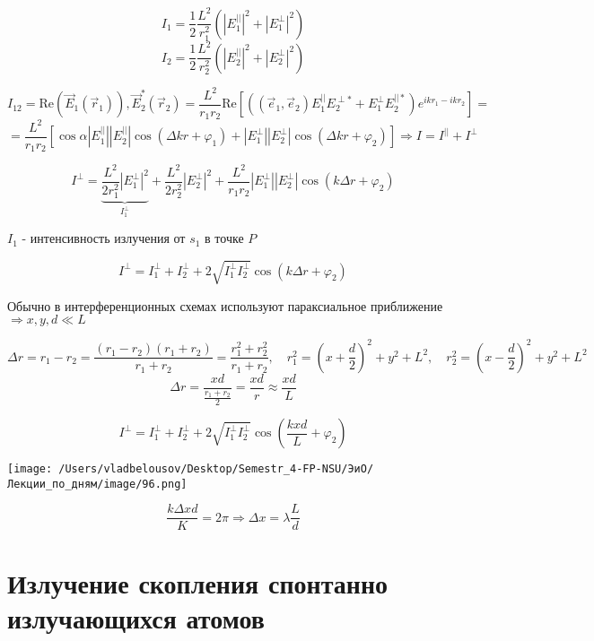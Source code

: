 \documentclass[12pt, a4paper]{report}
\begin{document}
\[ I_1  = \frac{1}{2 }  \frac{ L ^2 }{r_1 ^2 } ( |E_1 ^{|| } | ^2 + |E_1 ^{\perp } | ^2 )  \] 
\[ I_2 = \frac{1}{2 }  \frac{ L ^2 }{r_2  ^2 } ( |E_2 ^{ ||} | ^2 + |E_2 ^{\perp }  | ^2 )   \] 

\[ I_{12} = \mathrm{Re }  (\vec{E } _1 (\vec{r}_1 )), \vec{E } _2 ^{ * } (\vec{r}_2 )  = \frac{L ^2 }{r_1 r_2 } \mathrm{ Re } [((\vec{e } _1 , \vec{ e } _2 )E_1 ^{||}  E_2 ^{\perp* } + E_1 ^{\perp } E_2 ^{|| *}) e^{i k r_1 - i k r_2 }   ]  =\]  
\[ = \frac{L ^2 }{r_1 r_2 } [ \cos  \alpha |E_1 ^{||} | |E_2 ^{||} |\cos (\Delta k r + \varphi_1 )+ |E_1 ^{\perp } ||E_2^{\perp } |\cos (\Delta k r + \varphi_2 )]\Rightarrow I = I^{||}  + I^{\perp }   \] 

\[ I^{\perp } = \underbrace{\frac{L ^2}{2r_1 ^2 } |E_1 ^{\perp } | ^2}_{I_1^{\perp } } + \frac{L ^2 }{2 r_2 ^2 }|E_2 ^{\perp } | ^2   + \frac{L ^2 }{r_1 r_2 } |E_1 ^{\perp }  |  |E_2^{\perp } | \cos  (k \Delta r + \varphi_2 ) \] 

\( I_1  \) - интенсивность излучения от \( s_1  \) в точке \( P \) 

\[ I^{\perp } = I_1 ^{\perp } + I_2 ^{\perp } +2 \sqrt{I_1 ^{\perp }I_2 ^{\perp }  } \cos (k \Delta r + \varphi_2 )   \] 

Обычно в интерференционных схемах используют параксиальное приближение \( \Rightarrow x,y, d \ll L \) 

\[ \Delta r = r_1 -r_2 = \frac{ (r_1 - r_2 )(r_1 +r_2 )}{r_1 +r_2 } = \frac{ r_1 ^2 + r_2 ^2 }{r_1 + r_2 } , \quad  r_1 ^2  = \left( x + \frac{d}{2 }  \right) ^2 + y ^2+ L ^2 ,\quad  r_2 ^2 = \left(  x - \frac{d}{2 }  \right) ^2 + y ^2 + L ^2      \] 
\[ \Delta r = \frac{ x d }{\frac{r_1 + r_2 }{2 } }= \frac{xd}{r} \approx \frac{xd}{L}   \] 

\[ I^{\perp } = I_1^{\perp } + I_2 ^{\perp } + 2\sqrt{I_1 ^{\perp }I_2 ^{\perp }  } \cos \left( \frac{kxd}{L } + \varphi_2  \right)    \] 

\begin{center}
    \texttt{[image: /Users/vladbelousov/Desktop/Semestr\_4-FP-NSU/ЭиО/Лекции\_по\_дням/image/96.png]}
\end{center} 

\[ \frac{k \Delta x d }{ K }  = 2 \pi \Rightarrow \Delta x = \lambda \frac{L}{d}   \] 

\section{Излучение скопления спонтанно излучающихся атомов }
\end{document}
